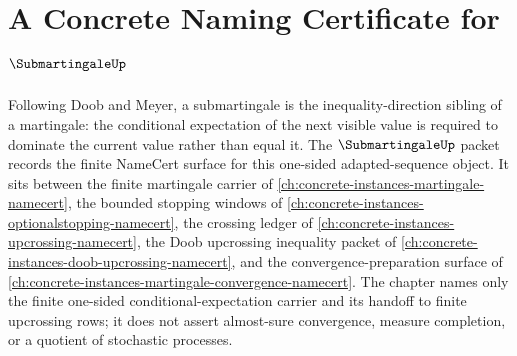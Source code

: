 \chapter{A Concrete Naming Certificate for $\SubmartingaleUp$}
\label{ch:concrete-instances-submartingale-namecert}

Following Doob and Meyer, a submartingale is the inequality-direction sibling of a martingale: the conditional expectation of the next visible value is required to dominate the current value rather than equal it. The $\SubmartingaleUp$ packet records the finite NameCert surface for this one-sided adapted-sequence object. It sits between the finite martingale carrier of \autoref{ch:concrete-instances-martingale-namecert}, the bounded stopping windows of \autoref{ch:concrete-instances-optionalstopping-namecert}, the crossing ledger of \autoref{ch:concrete-instances-upcrossing-namecert}, the Doob upcrossing inequality packet of \autoref{ch:concrete-instances-doob-upcrossing-namecert}, and the convergence-preparation surface of \autoref{ch:concrete-instances-martingale-convergence-namecert}. The chapter names only the finite one-sided conditional-expectation carrier and its handoff to finite upcrossing rows; it does not assert almost-sure convergence, measure completion, or a quotient of stochastic processes.

